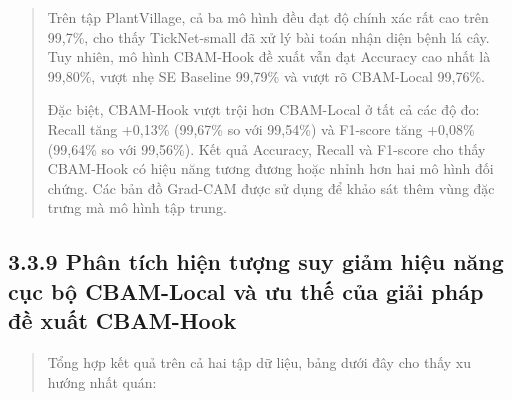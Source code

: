 \documentclass[
  12pt,
  a4paper,
]{report}
\begin{document}
\begin{quote}
Trên tập PlantVillage, cả ba mô hình đều đạt độ chính xác rất cao trên
99,7\%, cho thấy TickNet-small đã xử lý bài toán nhận diện bệnh lá cây.
Tuy nhiên, mô hình CBAM-Hook đề xuất vẫn đạt Accuracy cao nhất là
99,80\%, vượt nhẹ SE Baseline 99,79\% và vượt rõ CBAM-Local 99,76\%.

Đặc biệt, CBAM-Hook vượt trội hơn CBAM-Local ở tất cả các độ đo: Recall
tăng +0,13\% (99,67\% so với 99,54\%) và F1-score tăng +0,08\% (99,64\%
so với 99,56\%). Kết quả Accuracy, Recall và F1-score cho thấy CBAM-Hook
có hiệu năng tương đương hoặc nhỉnh hơn hai mô hình đối chứng. Các bản
đồ Grad-CAM được sử dụng để khảo sát thêm vùng đặc trưng mà mô hình tập
trung.
\end{quote}

\subsection*{3.3.9 Phân tích hiện tượng suy giảm hiệu năng cục bộ
CBAM-Local và ưu thế của giải pháp đề xuất
CBAM-Hook}\label{phuxe2n-tuxedch-hiux1ec7n-tux1b0ux1ee3ng-suy-giux1ea3m-hiux1ec7u-nux103ng-cux1ee5c-bux1ed9-cbam-local-vuxe0-ux1b0u-thux1ebf-cux1ee7a-giux1ea3i-phuxe1p-ux111ux1ec1-xuux1ea5t-cbam-hook}

\begin{quote}
Tổng hợp kết quả trên cả hai tập dữ liệu, bảng dưới đây cho thấy xu
hướng nhất quán:
\end{quote}
\end{document}
